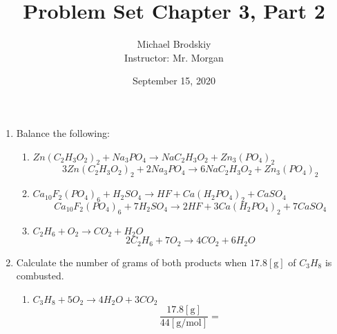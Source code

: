 \documentclass[12pt]{article}
\title{Problem Set Chapter 3, Part 2}
\date{September 15, 2020}
\author{Michael Brodskiy\\ \small Instructor: Mr. Morgan}
\begin{document}
\maketitle

\begin{enumerate}

  \item Balance the following:

    \begin{enumerate}

      \item $Zn(C_2H_3O_2)_2+Na_3PO_4\rightarrow NaC_2H_3O_2 + Zn_3(PO_4)_2$
       $$3Zn(C_2H_3O_2)_2+2Na_3PO_4\rightarrow 6NaC_2H_3O_2 + Zn_3(PO_4)_2$$

     \item $Ca_{10}F_2(PO_4)_6+H_2SO_4\rightarrow HF+Ca(H_2PO_4)_2+CaSO_4$
      $$Ca_{10}F_2(PO_4)_6+7H_2SO_4\rightarrow 2HF+3Ca(H_2PO_4)_2+7CaSO_4$$

     \item $C_2H_6+O_2\rightarrow CO_2+H_2O$
      $$2C_2H_6+7O_2\rightarrow 4CO_2+6H_2O$$


    \end{enumerate}

  \item Calculate the number of grams of both products when $17.8[\si{\gram}]$ of $C_3H_8$ is combusted.

    \begin{enumerate}

      \item $C_3H_8+5O_2\rightarrow 4H_2O+3CO_2$ 
        $$\frac{17.8[\si{\gram}]}{44[\si{\gram\per\mole}]}=$$

    \end{enumerate}

\end{enumerate}
\end{document}
